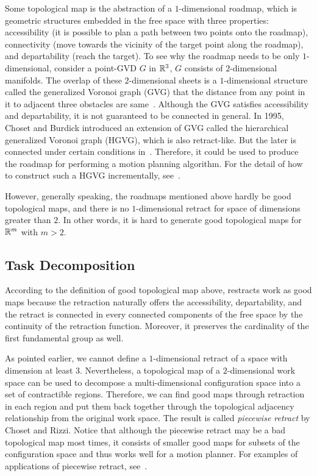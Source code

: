 Some topological map is the abstraction of a \(1\)-dimensional roadmap, which is geometric structures embedded in the free space with three properties: accessibility (it is possible to plan a path between two points onto the roadmap), connectivity (move towards the vicinity of the target point along the roadmap), and departability (reach the target).
To see why the roadmap needs to be only \(1\)-dimensional, consider a point-GVD \(G\) in \(\mathbb{R}^3\), \(G\) consists of \(2\)-dimensional manifolds. The overlap of these \(2\)-dimensional sheets is a \(1\)-dimensional structure called the generalized Voronoi graph (GVG) that the distance from any point in it to adjacent three obstacles are same~\cite{choset1996sensor}. Although the GVG satisfies accessibility and departability, it is not guaranteed to be connected in general. In 1995, Choset and Burdick introduced an extension of GVG called the hierarchical generalized Voronoi graph (HGVG), which is also retract-like. But the later is connected under certain conditions in~\cite{choset1996sensor}. Therefore, it could be used to produce the roadmap for performing a motion planning algorithm. For the detail of how to construct such a HGVG incrementally, see~\cite{choset1995sensor}.

However, generally speaking, the roadmaps mentioned above hardly be good topological maps, and there is no \(1\)-dimensional retract for space of dimensions greater than \(2\). In other words, it is hard to generate good topological maps for \(\mathbb{R}^m\) with \(m>2\).

\subsection{Task Decomposition}
According to the definition of good topological map above, restracts work as good maps because the retraction naturally offers the accessibility, departability, and the retract is connected in every connected components of the free space by the continuity of the retraction function. Moreover, it preserves the cardinality of the first fundamental group as well.

As pointed earlier, we cannot define a \(1\)-dimensional retract of a space with dimension at least \(3\). Nevertheless, a topological map of a \(2\)-dimensional work space can be used to decompose a multi-dimensional configuration space into a set of contractible regions.
Therefore, we can find good maps through retraction in each region and put them back together through the topological adjacency relationship from the original work space. The result is called \emph{piecewise retract} by Choset and Rizzi. Notice that although the piecewise retract may be a bad topological map most times, it consists of smaller good maps for subsets of the configuration space and thus works well for a motion planner.
For examples of applications of piecewise retract, see~\cite{DBLP:conf/isrr/ChosetR03}.